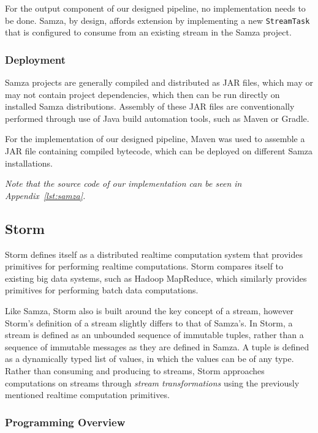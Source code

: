 For the output component of our designed pipeline, no implementation needs to be done. Samza, by design, affords extension
by implementing a new \texttt{StreamTask} that is configured to consume from an existing stream in the Samza project.

\subsubsection{Deployment}

Samza projects are generally compiled and distributed as JAR files, which may or may not contain project dependencies,
which then can be run directly on installed Samza distributions. Assembly of these JAR files are conventionally performed
through use of Java build automation tools, such as Maven or Gradle.

For the implementation of our designed pipeline, Maven was used to assemble a JAR file containing compiled bytecode, which can be deployed on different
Samza installations.

\textit{Note that the source code of our implementation can be seen in Appendix~\ref{lst:samza}.}



\subsection{Storm} %
\label{ssub:impl_storm}

Storm defines itself as a distributed realtime computation system that provides primitives for performing realtime
computations. Storm compares itself to existing big data systems, such as Hadoop MapReduce, which similarly provides
primitives for performing batch data computations.

Like Samza, Storm also is built around the key concept of a stream, however Storm's definition of a stream slightly
differs to that of Samza's. In Storm, a stream is defined as an unbounded sequence of immutable tuples, rather than a sequence
of immutable messages as they are defined in Samza. A tuple is defined as a dynamically typed list of values, in which
the values can be of any type. Rather than consuming and producing to streams, Storm approaches computations on streams
through \textit{stream transformations} using the previously mentioned realtime computation primitives.

\subsubsection{Programming Overview}

